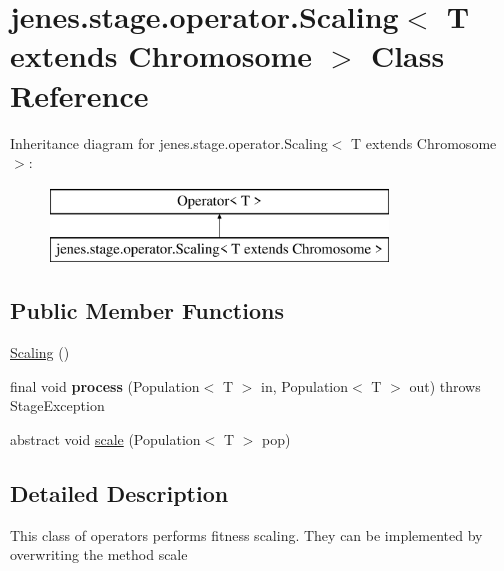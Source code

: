 \hypertarget{classjenes_1_1stage_1_1operator_1_1_scaling_3_01_t_01extends_01_chromosome_01_4}{\section{jenes.\-stage.\-operator.\-Scaling$<$ T extends Chromosome $>$ Class Reference}
\label{classjenes_1_1stage_1_1operator_1_1_scaling_3_01_t_01extends_01_chromosome_01_4}
}
Inheritance diagram for jenes.\-stage.\-operator.\-Scaling$<$ T extends Chromosome $>$\-:\begin{figure}[H]
\begin{center}
\leavevmode
\includegraphics[height=2.000000cm]{classjenes_1_1stage_1_1operator_1_1_scaling_3_01_t_01extends_01_chromosome_01_4}
\end{center}
\end{figure}
\subsection*{Public Member Functions}
\begin{DoxyCompactItemize}
\item 
\hyperlink{classjenes_1_1stage_1_1operator_1_1_scaling_3_01_t_01extends_01_chromosome_01_4_a04089dfb0f712c85ca27fdbab69a5b9e}{Scaling} ()
\item 
\hypertarget{classjenes_1_1stage_1_1operator_1_1_scaling_3_01_t_01extends_01_chromosome_01_4_a1577b3956323b5110e4c740ccaaa5905}{final void {\bfseries process} (Population$<$ T $>$ in, Population$<$ T $>$ out)  throws Stage\-Exception }\label{classjenes_1_1stage_1_1operator_1_1_scaling_3_01_t_01extends_01_chromosome_01_4_a1577b3956323b5110e4c740ccaaa5905}

\item 
abstract void \hyperlink{classjenes_1_1stage_1_1operator_1_1_scaling_3_01_t_01extends_01_chromosome_01_4_ae72d4b2ab8bd3504471ce67788c841cd}{scale} (Population$<$ T $>$ pop)
\end{DoxyCompactItemize}


\subsection{Detailed Description}
This class of operators performs fitness scaling. They can be implemented by overwriting the method {\ttfamily scale}

